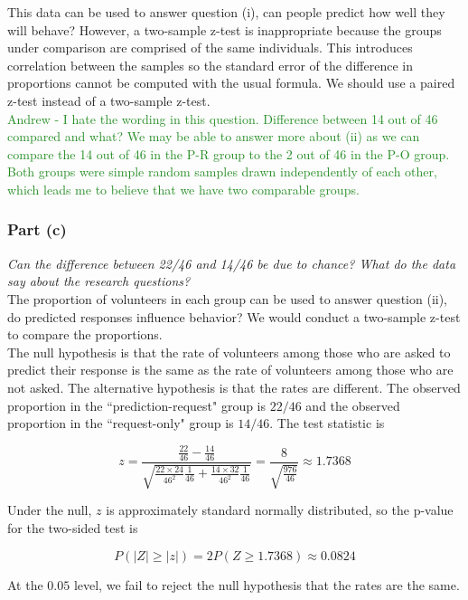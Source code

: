 \documentclass[11pt]{article}
\newcommand{\pr}{P} %
\begin{document}
This data can be used to answer question (i), can people predict how well they will behave?  However, a two-sample z-test is inappropriate because the groups under comparison are comprised of the same individuals.  This introduces correlation between the samples so the standard error of the difference in proportions cannot be computed with the usual formula.  We should use a paired z-test instead of a two-sample z-test.\\

\textcolor{ForestGreen}{Andrew - I hate the wording in this question.  Difference between 14 out of 46 compared and what?  We may be able to answer more about (ii) as we can compare the 14 out of 46 in the P-R group to the 2 out of 46 in the P-O group.  Both groups were simple random samples drawn independently of each other, which leads me to believe that we have two comparable groups.} %

\subsubsection*{Part (c)}
\textit{Can the difference between 22/46 and 14/46 be due to chance? What do the data say about the research questions?}\\

The proportion of volunteers in each group can be used to answer question (ii), do predicted responses influence behavior?  We would conduct a two-sample z-test to compare the proportions. \\

The null hypothesis is that the rate of volunteers among those who are asked to predict their response is the same as the rate of volunteers among those who are not asked.  The alternative hypothesis is that the rates are different.  The observed proportion in the ``prediction-request" group is $22/46$ and the observed proportion in the ``request-only" group is $14/46$.  The test statistic is

$$z = \frac{ \frac{22}{46}-\frac{14}{46}}{ \sqrt{\frac{22\times 24}{46^2}\frac{1}{46} + \frac{14\times32}{46^2}\frac{1}{46}}} = \frac{ 8}{ \sqrt{\frac{976}{46}}} \approx  1.7368$$

Under the null, $z$ is approximately standard normally distributed, so the p-value for the two-sided test is

$$\pr( \lvert Z \rvert \geq \lvert z \rvert) = 2 \pr(Z \geq 1.7368) \approx 0.0824$$

At the $0.05$ level, we fail to reject the null hypothesis that the rates are the same.\\
\end{document}
